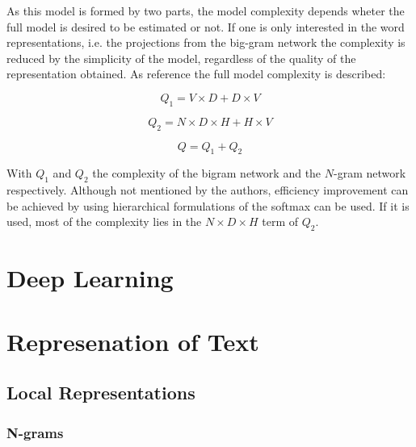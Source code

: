 As this model is formed by two parts, the model complexity depends wheter the
full model is desired to be estimated or not. If one is only interested in
the word representations, i.e. the projections from the big-gram network the
complexity is reduced  by the simplicity of the model, regardless of the
quality of the representation obtained.  As reference the full model
complexity is described: 


\begin{equation} Q_1 = V \times D + D \times V  \end{equation}

\begin{equation} Q_2 =  N \times D \times H + H \times V   \end{equation}

\begin{equation} Q = Q_1 + Q_2
\end{equation}

With $Q_1$ and $Q_2$ the complexity of the bigram network and the $N$-gram
network respectively. Although not mentioned by the authors, efficiency
improvement can be achieved by using hierarchical formulations of the softmax
can be used. If it is used, most of the complexity  lies in the  $N \times D \times
H$ term of $Q_2$.






\section{Deep Learning}
\label{sec:deep_learning}


\section{Represenation of Text}
\label{sec:rel_represenation_text}


\subsection{Local Representations}
\label{sec:rel_local_representation}

\subsubsection{N-grams}
\label{sec:sub_ngrams}

